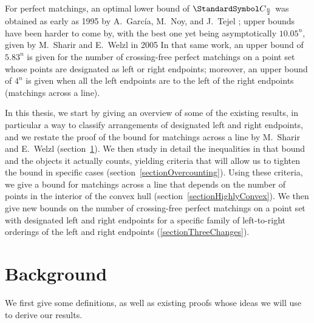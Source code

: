 \documentclass[10pt, a4paper, twoside]{basestyle}
\newcommand{\CatalanNumber}[1]{\StandardSymbol C_{#1}}
\begin{document}
For perfect matchings, an optimal lower bound of $\CatalanNumber {\frac n 2}$ was obtained as early as 1995 by A.~García,
M.~Noy, and J.~Tejel \cite{GarciaNoyTejel2000}; upper bounds have been harder to come by, with the best one
yet being asymptotically $10.05^n$, given by M.~Sharir and E.~Welzl in 2005 \cite{SharirWelzl2006}
In that same work, an upper bound of $5.83^n$ is given for the number of crossing-free perfect matchings on a
point set whose points are designated as left or right endpoints; moreover, an upper bound of $4^n$ is given
when all the left endpoints are to the left of the right endpoints (matchings across a line).

In this thesis, 
we start by giving an overview of some of the existing results, in particular a way
to classify arrangements of designated left and right endpoints,
and we restate the proof of the bound for matchings across a line by M.~Sharir and E.~Welzl
(section~\ref{sectionBackground}).
We then study in detail the inequalities in that bound and the objects it actually counts,
yielding criteria that will allow us to tighten the bound in specific cases (section~\ref{sectionOvercounting}).
Using these criteria, we give a bound for
matchings across a line that depends on the number of points in the interior of the convex hull
(section~\ref{sectionHighlyConvex}).
We then give new bounds on the number of crossing-free perfect matchings on a point set with designated left and
right endpoints for a specific family of left-to-right orderings of the left and right endpoints
(\ref{sectionThreeChanges}). 
\section{Background}
\label{sectionBackground}
We first give some definitions, as well as existing proofs whose ideas we will use to derive our results.
\end{document}
